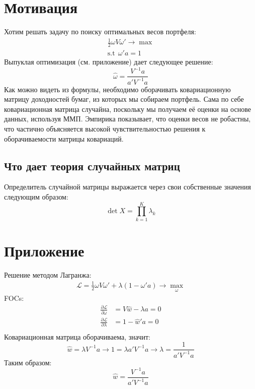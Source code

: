 \documentclass[11pt,a4paper]{article}
\begin{document}
\section*{Мотивация}
Хотим решать задачу по поиску оптимальных весов портфеля:
\begin{gather*}
    \frac{1}{2}\omega V \omega' \to \max \\
    \text{s.t}~~ \omega'a = 1
\end{gather*}
Выпуклая оптимизация (см. приложение) дает следующее решение:
\[
    \hat\omega = \frac{V^{-1}a}{a'V^{-1}a}
\]
Как можно видеть из формулы, необходимо оборачивать ковариационную
матрицу доходностей бумаг, из которых мы собираем портфель.
Сама по себе ковариационная матрица случайна, поскольку
мы получаем её оценки на основе данных, используя ММП.
Эмпирика показывает, что оценки весов не робастны, что частично
объясняется высокой чувствительностью решения к оборачиваемости
матрицы ковариаций.

\subsection*{Что дает теория случайных матриц}



Определитель случайной матрицы выражается через свои собственные значения следующим
образом:
\[
    \det X = \prod_{k=1}^{K} \lambda_k
\]

\section*{Приложение}
Решение методом Лагранжа:
\begin{align*}
    \mathcal{L} = \frac{1}{2}\omega V \omega' + \lambda\left(1 - \omega'a  \right) \to\max_{\omega}
\end{align*}
FOCs:
\begin{align*}
    \frac{\partial \mathcal{L}}{\partial \omega}  & = V\hat{w} - \lambda a = 0 \\
    \frac{\partial \mathcal{L}}{\partial \lambda} & = 1 -  \hat{w}'a = 0       \\
\end{align*}
Ковариационная матрица оборачиваема, значит:
\[
    \hat{w} = \lambda V^{-1}a \to 1 = \lambda a' V^{-1}a \to \lambda = \frac{1}{a'V^{-1}a}
\]
Таким образом:
\[
    \hat{w} = \frac{V^{-1}a}{a'V^{-1}a}
\]
\end{document}
